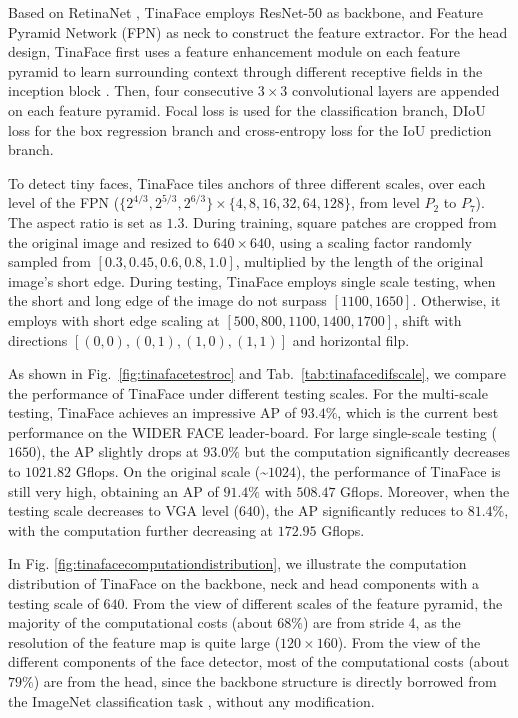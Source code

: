 \documentclass[10pt,twocolumn,letterpaper]{article}
\begin{document}
Based on RetinaNet \cite{lin2017feature}, TinaFace \cite{zhu2020tinaface} employs ResNet-50 \cite{he2016deep} as backbone, and Feature Pyramid Network (FPN) \cite{lin2017feature} as neck to construct the feature extractor. For the head design, TinaFace first uses a feature enhancement module on each feature pyramid to learn surrounding context through different receptive fields in the inception block \cite{szegedy2015going}. 
Then, four consecutive $3\times 3$ convolutional layers are appended on each feature pyramid. Focal loss \cite{lin2017focal} is used for the classification branch, DIoU loss \cite{zheng2020distance} for the box regression branch and cross-entropy loss for the IoU prediction branch.

To detect tiny faces, TinaFace tiles anchors of three different scales, over each level of the FPN (\ie $\{2^{4/3}, 2^{5/3},2^{6/3}\} \times \{4, 8, 16, 32, 64, 128\}$, from level $P_2$ to $P_7$). The aspect ratio is set as $1.3$. During training, square patches are cropped from the original image and resized to $640 \times 640$, using a scaling factor randomly sampled from $[0.3, 0.45, 0.6, 0.8, 1.0]$, multiplied by the length of the original image's short edge. During testing, TinaFace employs single scale testing,
when the short and long edge of the image do not surpass $[1100, 1650]$. Otherwise, it employs with short edge scaling at $[500, 800, 1100, 1400, 1700]$, shift with directions $[(0, 0), (0, 1), (1, 0), (1, 1)]$ and horizontal filp.

As shown in Fig.~\ref{fig:tinafacetestroc} and Tab.~\ref{tab:tinafacedifscale}, we compare the performance of TinaFace under different testing scales. For the multi-scale testing, TinaFace achieves an impressive AP of $93.4\%$, which is the current best performance on the WIDER FACE leader-board. For large single-scale testing ($1650$), the AP slightly drops at $93.0\%$ but the computation significantly decreases to $1021.82$ Gflops. On the original scale (\textasciitilde$1024$), the performance of TinaFace is still very high, obtaining an AP of $91.4\%$ with $508.47$ Gflops. Moreover, when the testing scale decreases to VGA level ($640$), the AP significantly reduces to $81.4\%$, with the computation further decreasing at $172.95$ Gflops.

In Fig. \ref{fig:tinafacecomputationdistribution}, we illustrate the computation distribution of TinaFace on the backbone, neck and head components with a testing scale of $640$. From the view of different scales of the feature pyramid, the majority of the computational costs (about $68\%$) are from stride 4, as the resolution of the feature map is quite large ($120\times160$). From the view of the different components of the face detector, most of the computational costs (about $79\%$) are from the head, since the backbone structure is directly borrowed from the ImageNet classification task \cite{deng2009imagenet}, without any modification.
\end{document}

